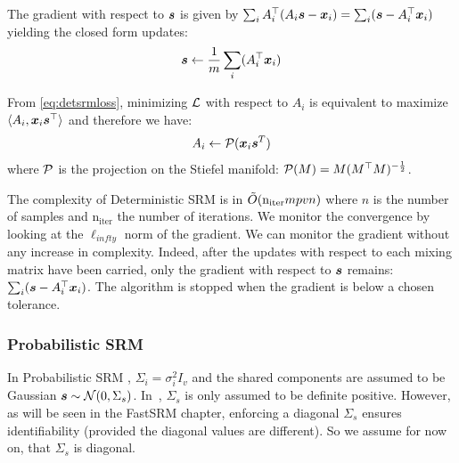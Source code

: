 The gradient with respect to $\boldsymbol{s}$ is given by $ \sum_i A_i^{\top}(A_i \boldsymbol{s} -
\boldsymbol{x}_i) = \sum_i (\boldsymbol{s} -
A_i^{\top} \boldsymbol{x}_i)$
yielding the closed form updates:
\begin{equation}
  \boldsymbol{s} \leftarrow  \frac1m \sum_i (A_i^{\top} \boldsymbol{x}_i)
  \label{eq:srm:supdate}
\end{equation}

From \eqref{eq:detsrmloss}, minimizing $\mathcal{L}$ with respect to $A_i$ is
equivalent to maximize $\langle A_i, \boldsymbol{x}_i \boldsymbol{s}^{\top} \rangle$ and therefore we
have:
\begin{equation}
  A_i \leftarrow  \mathcal{P}(\boldsymbol{x}_i \boldsymbol{s}^T)
  \label{eq:detsrm:Aiupdate}
\end{equation}
where $\mathcal{P}$ is the projection on the Stiefel manifold: $\mathcal{P}(M) = M
(M^{\top}M)^{-\frac12}$.

The complexity of Deterministic SRM is in $\tilde{O}(\mathrm{n_{iter}} mpvn)$ where
$n$ is the number of samples and $\mathrm{n_{iter}}$ the number of iterations.
We monitor the convergence by looking at the $\ell_{infty}$ norm of the
gradient. We can monitor the gradient without any increase in complexity.
Indeed, after the updates with respect to each mixing matrix have been
carried, only the gradient with respect to $\boldsymbol{s}$ remains: $\sum_i
(\boldsymbol{s} - A_i^{\top}\boldsymbol{x}_i)$. The algorithm is stopped when the
gradient is below a chosen tolerance.

\subsubsection{Probabilistic SRM}
\label{sec:probabilisticsrm}
In Probabilistic SRM , $\Sigma_i=\sigma_i^2 I_v$ and the shared
components are assumed to be Gaussian $\boldsymbol{s} \sim \mathcal{N}(0, \Sigma_s)$.
In~\cite{chen2015reduced}, $\Sigma_s$ is only assumed to be definite positive. However,
as will be seen in the FastSRM chapter, enforcing a diagonal $\Sigma_s$ ensures
identifiability (provided the diagonal values are different). So we assume for
now on, that $\Sigma_s$ is diagonal.

